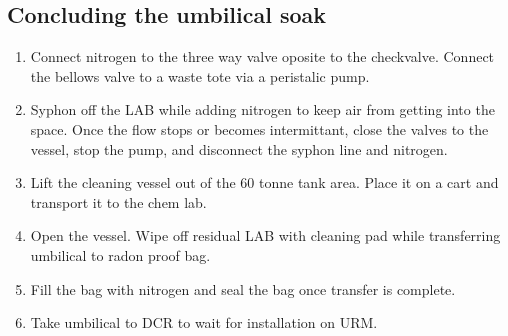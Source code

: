 \subsection{Concluding the umbilical soak}
\begin{enumerate}
\item Connect nitrogen to the three way valve oposite to the checkvalve. Connect the bellows valve to a waste tote via a peristalic pump.
\item Syphon off the LAB while adding nitrogen to keep air from getting into the space. Once the flow stops or becomes intermittant, close the valves to the vessel, stop the pump, and disconnect the syphon line and nitrogen. 
\item Lift the cleaning vessel out of the 60 tonne tank area. Place it on a cart and transport it to the chem lab.
\item Open the vessel. Wipe off residual LAB with cleaning pad while transferring umbilical to radon proof bag. 
\item Fill the bag with nitrogen and seal the bag once transfer is complete.
\item Take umbilical to DCR to wait for installation on URM.
\end{enumerate}
